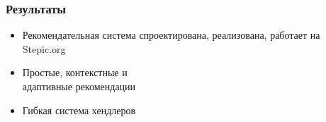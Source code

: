 \documentclass{beamer}
\begin{document}
\begin{frame}\frametitle{Результаты}
\Large
    \begin{itemize}
        \item Рекомендательная система спроектирована, реализована, работает на Stepic.org
        \medskip
        \item Простые, контекстные и \\адаптивные рекомендации
        \medskip
        \item Гибкая система хендлеров
    \end{itemize}

\end{frame}
\end{document}
